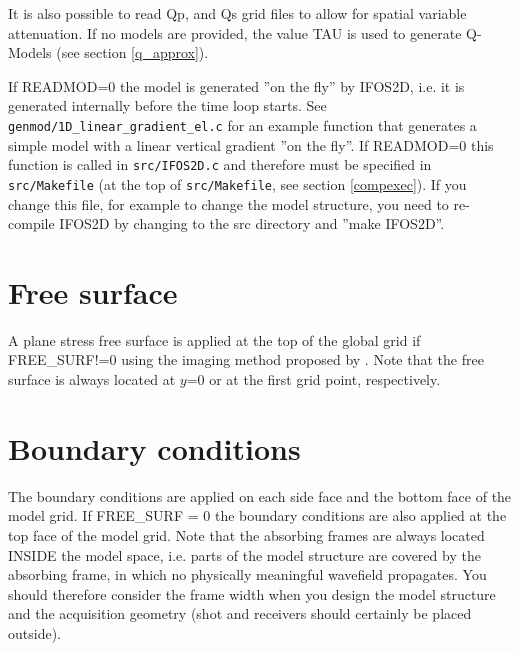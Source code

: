 It is also possible to read Qp, and Qs grid files to allow for spatial variable attenuation. If no models are provided, the value TAU is used to generate Q-Models (see section \ref{q_approx}).

If READMOD=0 the model is generated ''on the fly'' by IFOS2D, i.e. it is generated internally before the time loop starts. See \texttt{genmod/1D\_linear\_gradient\_el.c} for an example function that generates a simple model with a linear vertical gradient ''on the fly''. If READMOD=0 this function is called in \texttt{src/IFOS2D.c} and therefore must be specified in \texttt{src/Makefile} (at the top of \texttt{src/Makefile}, see section \ref{compexec}). If you change this file, for example to change the model structure, you need to re-compile IFOS2D by changing to the src directory and ''make IFOS2D''.


\section{Free surface}  
{\color{blue}{\begin{verbatim}
"Free Surface" : "comment",
			"FREE_SURF" : "1",
\end{verbatim}}}
A plane stress free surface is applied at the top of the global grid if FREE\_SURF!=0 using the imaging method proposed by \cite{levander:88}. Note that the free surface is always located at $y$=0 or at the first grid point, respectively.


\section{Boundary conditions}
\label{abs}
{\color{blue}{\begin{verbatim}
"PML Boundary" : "comment",
			"FW" : "20",
			"VPPML" : "600.0",
			"FPML" : "31.25",
			"BOUNDARY" : "0",
			"npower" : "4.0",
			"k_max_PML" : "8.0",

\end{verbatim}}}
The boundary conditions are applied on each side face and the bottom face of the model grid. If FREE\_SURF = 0 the boundary conditions are also applied at the top face of the model grid. Note that the absorbing frames are always located INSIDE the model space, i.e. parts of the model structure are covered by the absorbing frame, in which no physically meaningful wavefield propagates. You should therefore consider the frame width when you design the model structure and the acquisition geometry (shot and receivers should certainly be placed outside).

